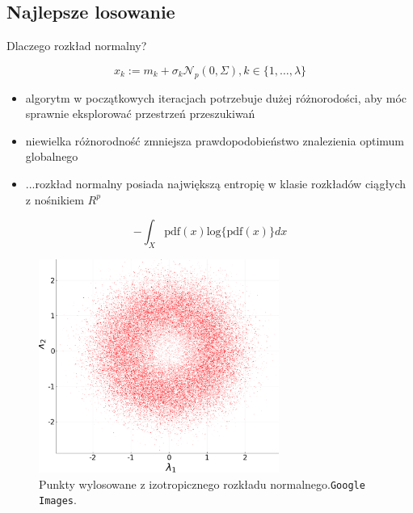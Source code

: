 \documentclass[slidescentered]{beamer}
\begin{document}
\subsection{Najlepsze losowanie}

\begin{frame}{Dlaczego rozkład normalny?}

	\begin{equation}
		x_{k} :=  m_{k} + \sigma_{k}\mathcal{N}_{p}(0, \Sigma), k \in \{1, \dots, \lambda\}
	\end{equation}
\end{frame}

\begin{frame}
	\begin{itemize}
	 	\item algorytm w początkowych iteracjach potrzebuje dużej różnorodości, aby móc sprawnie eksplorować przestrzeń przeszukiwań 
	\pause 	\item niewielka różnorodność zmniejsza prawdopodobieństwo znalezienia optimum globalnego
	\pause	\item ...rozkład normalny posiada największą entropię w klasie rozkładów ciągłych z nośnikiem $R^{p}$

	\pause 
	\end{itemize}
	\begin{equation}
		-\int_{X}\text{pdf}(x)\text{log}\{\text{pdf}(x)\}dx
	\end{equation}
\end{frame}

\begin{frame}
	\begin{figure}[H]
		\centering
		\includegraphics[width=0.7\textwidth, height=0.7\textheight]{./gauss-iso.png}
		\caption{Punkty wylosowane z izotropicznego rozkładu normalnego.\texttt{Google Images}.}
	\end{figure}
\end{frame}
\end{document}
